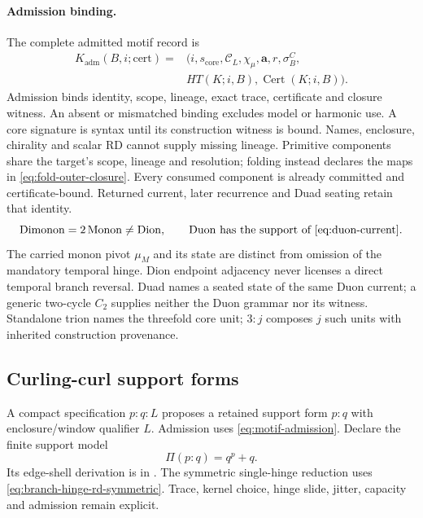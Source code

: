 \paragraph{Admission binding.}
The complete admitted motif record is
\begin{equation}
\begin{split}
K_{\mathrm{adm}}(B,i;\mathrm{cert})={}&
(i,s_{\mathrm{core}},\mathcal C_L,\chi_\mu,\mathbf a,r,\sigma^C_B,\\
&HT(K;i,B),\operatorname{Cert}(K;i,B)).
\end{split}
\label{eq:motif-admission}
\end{equation}
Admission binds identity, scope, lineage, exact trace, certificate and closure
witness. An absent or mismatched binding excludes model or harmonic use. A core signature is syntax until its construction witness is bound.
Names, enclosure, chirality and scalar RD cannot supply missing lineage. Primitive components share the target's scope, lineage and
resolution; folding instead declares the maps in \eqref{eq:fold-outer-closure}.
Every consumed component is already committed and certificate-bound. Returned
current, later recurrence and Duad seating retain that identity.
\begin{equation}
\mathrm{Dimonon}=2\,\mathrm{Monon}\ne\mathrm{Dion},\qquad
\mathrm{Duon}\ \text{has the support of }\eqref{eq:duon-current}.
\label{eq:motif-grammar}
\end{equation}
The carried monon pivot \(\mu_M\) and its state are distinct from omission of
the mandatory temporal hinge. Dion endpoint adjacency never licenses a direct
temporal branch reversal. Duad names a seated state of the same Duon current;
a generic two-cycle \(C_2\) supplies neither the Duon grammar nor its witness.
Standalone trion names the threefold core unit; \(3:j\) composes \(j\) such
units with inherited construction provenance.

\subsection{Curling-curl support forms}\label{subsec:curling-curl-support-forms}

A compact specification \(p{:}q{:}L\) proposes a retained support form
\(p{:}q\) with enclosure/window qualifier \(L\). Admission uses
\eqref{eq:motif-admission}. Declare the finite support model
\begin{equation}
\Pi(p{:}q)=q^p+q.
\label{eq:curling-support-model}
\end{equation}
Its edge-shell derivation is in .
The symmetric single-hinge reduction uses \eqref{eq:branch-hinge-rd-symmetric}.
Trace, kernel choice, hinge slide, jitter, capacity and admission remain explicit.


